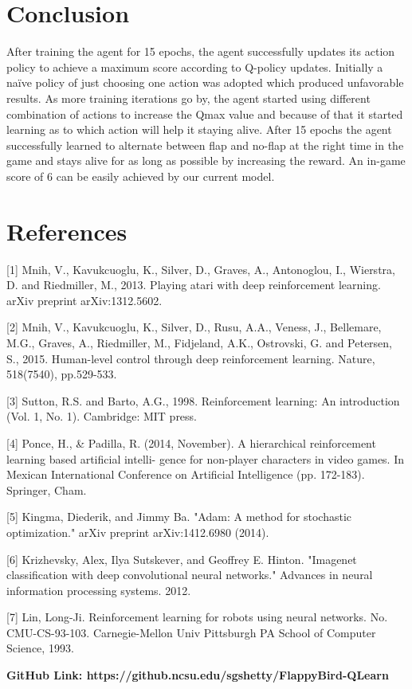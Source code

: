 \documentclass{article}
\begin{document}
\section{Conclusion}

After training the agent for 15 epochs, the agent successfully updates its action policy to achieve a maximum score according to Q-policy updates. Initially a naïve policy of just choosing one action was adopted which produced unfavorable results. As more training iterations go by, the agent started using different combination of actions to increase the Qmax value and because of that it started learning as to which action will help it staying alive. After 15 epochs the agent successfully learned to alternate between flap and no-flap at the right time in the game and stays alive for as long as possible by increasing the reward. An in-game score of 6 can be easily achieved by our current model. 

\section*{References}

\small

[1] \label{pap1}Mnih, V., Kavukcuoglu, K., Silver, D., Graves, A., Antonoglou, I., Wierstra, D. and Riedmiller, M., 2013. Playing atari with deep reinforcement learning. arXiv preprint arXiv:1312.5602.

[2] Mnih, V., Kavukcuoglu, K., Silver, D., Rusu, A.A., Veness, J., Bellemare, M.G., Graves, A., Riedmiller, M., Fidjeland, A.K., Ostrovski, G. and Petersen, S., 2015. Human-level control through deep reinforcement learning. Nature, 518(7540), pp.529-533.

[3] Sutton, R.S. and Barto, A.G., 1998. Reinforcement learning: An introduction (Vol. 1, No. 1). Cambridge: MIT press.

[4] Ponce, H., \& Padilla, R. (2014, November). A hierarchical reinforcement learning based artificial intelli- gence for non-player characters in video games. In Mexican International Conference on Artificial Intelligence (pp. 172-183). Springer, Cham.

[5] Kingma, Diederik, and Jimmy Ba. "Adam: A method for stochastic optimization." arXiv preprint arXiv:1412.6980 (2014).

[6]	Krizhevsky, Alex, Ilya Sutskever, and Geoffrey E. Hinton. "Imagenet classification with deep convolutional neural networks." Advances in neural information processing systems. 2012.

[7]	Lin, Long-Ji. Reinforcement learning for robots using neural networks. No. CMU-CS-93-103. Carnegie-Mellon Univ Pittsburgh PA School of Computer Science, 1993.

\textbf{GitHub Link: https://github.ncsu.edu/sgshetty/FlappyBird-QLearn}
\end{document}
